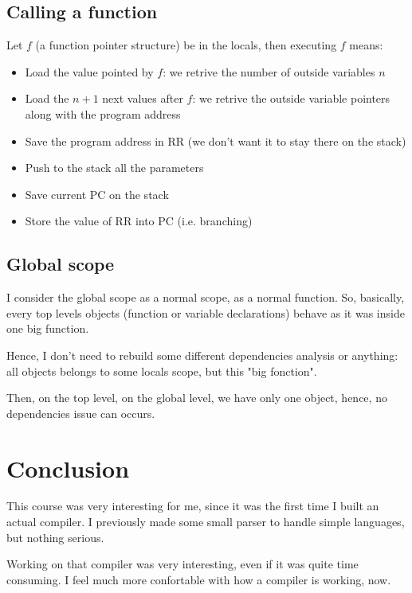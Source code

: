 \documentclass{article}
\begin{document}
		\subsection{Calling a function}
			Let $f$ (a function pointer structure) be in the locals, then executing $f$ means:
			\begin{itemize}
				\item Load the value pointed by $f$: we retrive the number of outside variables $n$
				\item Load the $n+1$ next values after $f$: we retrive the outside variable pointers along with the program address
				\item Save the program address in RR (we don't want it to stay there on the stack)
				\item Push to the stack all the parameters
				\item Save current PC on the stack 
				\item Store the value of RR into PC (i.e. branching)  
			\end{itemize}
		\subsection{Global scope}
			I consider the global scope as a normal scope, as a normal function. So, basically, every top levels objects (function or variable declarations) behave as it was inside one big function.

			Hence, I don't need to rebuild some different dependencies analysis or anything: all objects belongs to some locals scope, but this "big fonction".

			Then, on the top level, on the global level, we have only one object, hence, no dependencies issue can occurs.
	\section{Conclusion}
		This course was very interesting for me, since it was the first time I built an actual compiler. I previously made some small parser to handle simple languages, but nothing serious.

		Working on that compiler was very interesting, even if it was quite time consuming. I feel much more confortable with how a compiler is working, now.
\end{document}
